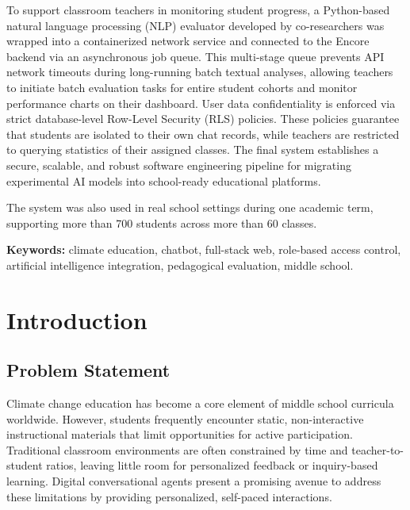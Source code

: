 \documentclass[12pt,a4paper,oneside]{report}
\begin{document}
    To support classroom teachers in monitoring student progress, a Python-based natural language processing (NLP) evaluator developed by co-researchers was wrapped into a containerized network service and connected to the Encore backend via an asynchronous job queue. This multi-stage queue prevents API network timeouts during long-running batch textual analyses, allowing teachers to initiate batch evaluation tasks for entire student cohorts and monitor performance charts on their dashboard. User data confidentiality is enforced via strict database-level Row-Level Security (RLS) policies. These policies guarantee that students are isolated to their own chat records, while teachers are restricted to querying statistics of their assigned classes. The final system establishes a secure, scalable, and robust software engineering pipeline for migrating experimental AI models into school-ready educational platforms.

    The system was also used in real school settings during one academic term, supporting more than 700 students across more than 60 classes.

    \vspace{0.5cm}
    \noindent\textbf{Keywords:} climate education, chatbot, full-stack web, role-based access control, artificial intelligence integration, pedagogical evaluation, middle school.

    \clearpage
    \tableofcontents

    \clearpage
    \setcounter{page}{1}

    \chapter{Introduction}
    \label{ch:intro}

    \section{Problem Statement}
    Climate change education has become a core element of middle school curricula worldwide. However, students frequently encounter static, non-interactive instructional materials that limit opportunities for active participation. Traditional classroom environments are often constrained by time and teacher-to-student ratios, leaving little room for personalized feedback or inquiry-based learning. Digital conversational agents present a promising avenue to address these limitations by providing personalized, self-paced interactions.
\end{document}
